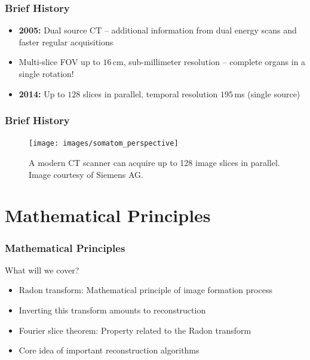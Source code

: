 \begin{frame}
	\frametitle{Brief History}

	\begin{itemize}
		\setlength\itemsep{0.3cm}
		\item \textcolor{faublue}{\textbf{2005:}} Dual source CT -- additional information from dual energy scans and faster regular acquisitions
		\item Multi-slice FOV up to $16$\,cm, sub-millimeter resolution -- complete organs in a single rotation!
		\item \textcolor{faublue}{\textbf{2014:}} Up to $128$ slices in parallel, temporal resolution $195$\,ms (single source)

	\end{itemize}

\end{frame}


\begin{frame}
	\frametitle{Brief History}

	\begin{figure}[tb]
		\centering
		\texttt{[image: images/somatom\_perspective]}
		\caption{A modern CT scanner can acquire up to 128 image slices in parallel. Image courtesy of Siemens AG.}%
		\label{fig:ct_hist_2}
	\end{figure}

\end{frame}

\section{Mathematical Principles}%
\label{sec:ct_mat}

\begin{frame}
	\frametitle{Mathematical Principles}

	What will we cover?
	\vspace{0.3cm}

	\begin{itemize}
		\setlength\itemsep{0.3cm}
		\item Radon transform: Mathematical principle of image formation process
		\item Inverting this transform amounts to reconstruction
		\item Fourier slice theorem: Property related to the Radon transform
		\item Core idea of important reconstruction algorithms
	\end{itemize}

\end{frame}


